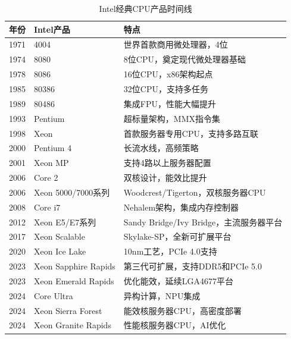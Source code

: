\documentclass[12pt,UTF8]{ctexbook}
\begin{document}
\begin{table}[H]
    \centering
    \begin{tabular}{|p{2cm}|p{5cm}|p{5cm}|}
        \hline
        \textbf{年份} & \textbf{Intel产品} & \textbf{特点} \\
        \hline
        1971 & 4004 & 世界首款商用微处理器，4位 \\
        \hline
        1974 & 8080 & 8位CPU，奠定现代微处理器基础 \\
        \hline
        1978 & 8086 & 16位CPU，x86架构起点 \\
        \hline
        1985 & 80386 & 32位CPU，支持多任务 \\
        \hline
        1989 & 80486 & 集成FPU，性能大幅提升 \\
        \hline
        1993 & Pentium & 超标量架构，MMX指令集 \\
        \hline
        1998 & Xeon & 首款服务器专用CPU，支持多路互联 \\
        \hline
        2000 & Pentium 4 & 长流水线，高频策略 \\
        \hline
        2001 & Xeon MP & 支持4路以上服务器配置 \\
        \hline
        2006 & Core 2 & 双核设计，能效比提升 \\
        \hline
        2006 & Xeon 5000/7000系列 & Woodcrest/Tigerton，双核服务器CPU \\
        \hline
        2008 & Core i7 & Nehalem架构，集成内存控制器 \\
        \hline
        2012 & Xeon E5/E7系列 & Sandy Bridge/Ivy Bridge，主流服务器平台 \\
        \hline
        2017 & Xeon Scalable & Skylake-SP，全新可扩展平台 \\
        \hline
        2020 & Xeon Ice Lake & 10nm工艺，PCIe 4.0支持 \\
        \hline
        2023 & Xeon Sapphire Rapids & 第三代可扩展，支持DDR5和PCIe 5.0 \\
        \hline
        2023 & Xeon Emerald Rapids & 优化能效，延续LGA4677平台 \\
        \hline
        2024 & Core Ultra & 异构计算，NPU集成 \\
        \hline
        2024 & Xeon Sierra Forest & 能效核服务器CPU，高密度部署 \\
        \hline
        2024 & Xeon Granite Rapids & 性能核服务器CPU，AI优化 \\
        \hline
    \end{tabular}
    \caption{Intel经典CPU产品时间线}
    \label{tab:intel_history}
\end{table}
\end{document}
